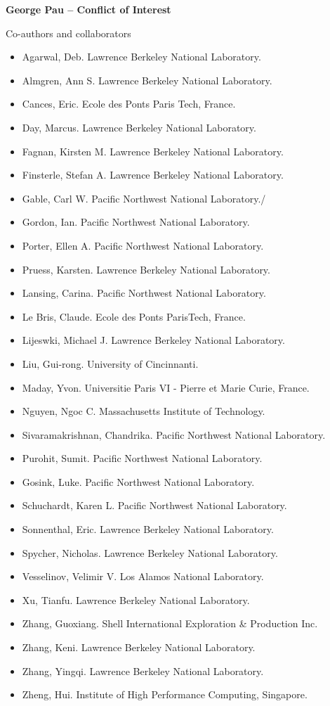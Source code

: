 \documentclass[11pt]{article}
\begin{document}
\begin{center}
{\large{\bf George Pau -- Conflict of Interest}} \\
\end{center}

\vspace{.2 true in}

Co-authors and collaborators
\begin{itemize}
\item Agarwal, Deb. Lawrence Berkeley National Laboratory.
\item Almgren, Ann S. Lawrence Berkeley National Laboratory.
\item	Cances, Eric. Ecole des Ponts Paris Tech, France.
\item	Day, Marcus. Lawrence Berkeley National Laboratory.
\item	Fagnan, Kirsten M. Lawrence Berkeley National Laboratory.
\item	Finsterle, Stefan A. Lawrence Berkeley National Laboratory.
\item	Gable, Carl W. Pacific Northwest National Laboratory./
\item	Gordon, Ian. Pacific Northwest National Laboratory.
\item	Porter, Ellen A. Pacific Northwest National Laboratory.
\item	Pruess, Karsten. Lawrence Berkeley National Laboratory.
\item	Lansing, Carina. Pacific Northwest National Laboratory.
\item	Le Bris, Claude. Ecole des Ponts ParisTech, France.
\item	Lijeswki, Michael J. Lawrence Berkeley National Laboratory.
\item	Liu, Gui-rong. University of Cincinnanti.
\item	Maday, Yvon. Universitie Paris VI - Pierre et Marie Curie, France.
\item	Nguyen, Ngoc C. Massachusetts Institute of Technology.
\item	Sivaramakrishnan, Chandrika. Pacific Northwest National Laboratory.
\item	Purohit, Sumit. Pacific Northwest National Laboratory.
\item	Gosink, Luke. Pacific Northwest National Laboratory.
\item	Schuchardt, Karen L. Pacific Northwest National Laboratory.
\item	Sonnenthal, Eric. Lawrence Berkeley National Laboratory.
\item	Spycher, Nicholas. Lawrence Berkeley National Laboratory.
\item	Vesselinov, Velimir V. Los Alamos National Laboratory.
\item	Xu, Tianfu. Lawrence Berkeley National Laboratory.
\item	Zhang, Guoxiang. Shell International Exploration \& Production Inc.
\item	Zhang, Keni. Lawrence Berkeley National Laboratory.
\item	Zhang, Yingqi. Lawrence Berkeley National Laboratory.
\item	Zheng, Hui. Institute of High Performance Computing, Singapore.
\end{itemize}
\end{document}
